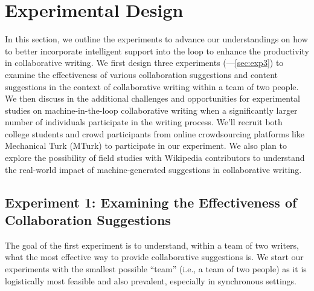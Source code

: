 
\section{Experimental Design}

In this section, we outline the experiments 
to advance our understandings on how to better incorporate intelligent support into the loop to enhance the productivity in collaborative writing. We first design three experiments (---\ref{sec:exp3}) to examine the effectiveness of various collaboration suggestions and content suggestions in the context of collaborative writing within a team of two people. We then discuss in  the additional challenges and opportunities for experimental studies on machine-in-the-loop collaborative writing when a significantly larger number of individuals participate in the writing process. We'll recruit both college students and crowd participants from online crowdsourcing platforms like 
Mechanical Turk (MTurk) to participate in our experiment. We also plan to explore the possibility of field studies with Wikipedia contributors to understand the real-world impact of machine-generated suggestions in collaborative writing.

\subsection{Experiment 1: Examining the Effectiveness of Collaboration Suggestions}
\label{sec:exp1}

The goal of the first experiment is to understand, within a team of two writers, what the most effective way to provide collaborative suggestions is. We start our experiments with the smallest possible ``team'' (i.e., a team of two people) as it is logistically most feasible and also prevalent, especially in synchronous settings.

